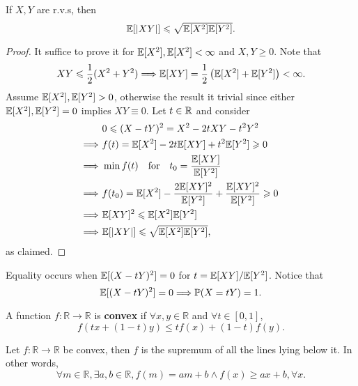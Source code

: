 \begin{proposition}\label{prop:Cauchy-Schwartz inequality}
    If $X,Y$ are r.v.s, then 
    \[
        {\mathbb{E}}[|XY|]\leqslant \sqrt{{\mathbb{E}}[X^2]{\mathbb{E}}[Y^2]}.
    \]
\end{proposition}
\begin{proof}
    It suffice to prove it for $ {\mathbb{E}}[X^2],{\mathbb{E}}[X^2]<\infty $ and $ X,Y\ge 0 $. Note that 
    \[
        XY\leqslant \frac{1}{2}(X^2+Y^2) \Longrightarrow {\mathbb{E}}[XY] = \frac{1}{2}\left( {\mathbb{E}}[X^2]+{\mathbb{E}}[Y^2] \right)<\infty .
    \]
    Assume $ {\mathbb{E}}[X^2],{\mathbb{E}}[Y^2]>0 $, otherwise the result it trivial since either $ {\mathbb{E}}[X^2],{\mathbb{E}}[Y^2]=0 $ implies $XY\equiv 0$. Let $t\in {\mathbb{R}}$ and consider 
    \begin{align*}
        &\ 0\leqslant (X-tY)^2 = X^2-2tXY-t^2Y^2\\ 
        \Longrightarrow &\  f(t) = {\mathbb{E}}[X^2]-2t{\mathbb{E}}[XY]+t^2{\mathbb{E}}[Y^2]\geqslant 0\\ 
        \Longrightarrow &\  \min f(t)\quad\text{for}\quad t_0 = \frac{{\mathbb{E}}[XY]}{{\mathbb{E}}[Y^2]} \\ 
        \Longrightarrow &\  f(t_0)={\mathbb{E}}[X^2]-\frac{2{\mathbb{E}}[XY]^2}{{\mathbb{E}}[Y^2]}+\frac{{\mathbb{E}}[XY]^2}{{\mathbb{E}}[Y^2]}\geqslant 0\\ 
        \Longrightarrow &\  {\mathbb{E}}[XY]^2\leqslant {\mathbb{E}}[X^2]{\mathbb{E}}[Y^2]\\ 
        \Longrightarrow &\  {\mathbb{E}}[|XY|]\leqslant \sqrt{{\mathbb{E}}[X^2]{\mathbb{E}}[Y^2]},
    \end{align*}
    as claimed.
\end{proof}
\begin{remark}
    Equality occurs when $ {\mathbb{E}}[(X-tY)^2]=0 $ for $ t={\mathbb{E}}[XY]/{\mathbb{E}}[Y^2] $. Notice that 
    \[
        {\mathbb{E}}[(X-tY)^2]=0 \Longrightarrow \mathbb{P}(X=tY)=1.
    \]
\end{remark}
\begin{definition}
    A function $ f:\mathbb{R} \to \mathbb{R} $ is \textbf{convex} if $ \forall x,y\in \mathbb{R}  $ and $ \forall t\in [0,1] $,
    \[
        f(tx+(1-t)y)\le tf(x)+(1-t)f(y).
    \]
\end{definition}
\begin{lemma}\label{lma:Jensen}
    Let $ f:\mathbb{R} \to \mathbb{R}  $ be convex, then $f$ is the supremum of all the lines lying below it. In other words,
    \[
        \forall m\in \mathbb{R}, \exists a,b\in \mathbb{R}, f(m)=am+b \land f(x)\ge ax+b,\forall x.
    \]
\end{lemma}

